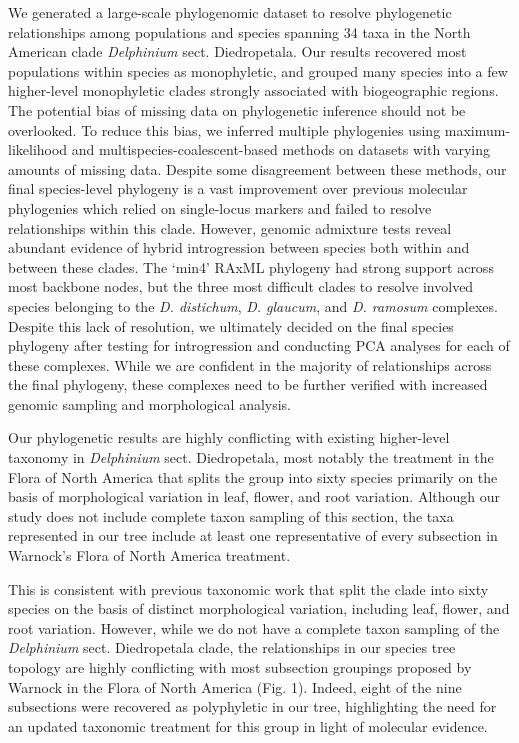 \documentclass[11pt]{article}
\begin{document}
We generated a large-scale phylogenomic dataset to resolve phylogenetic relationships 
among populations and species spanning 34 taxa in the North American clade \emph{Delphinium}
sect. Diedropetala. Our results recovered most populations within species as monophyletic,
and grouped many species into a few higher-level monophyletic clades strongly associated 
with biogeographic regions.
The potential bias of missing data on phylogenetic inference should not be overlooked. 
To reduce this bias, we inferred multiple phylogenies using maximum-likelihood and
multispecies-coalescent-based methods on datasets with varying amounts of missing data.
Despite some disagreement between these methods, our final species-level phylogeny is
a vast improvement over previous molecular phylogenies which relied on single-locus
markers and failed to resolve relationships within this clade.
% 
However, genomic admixture tests reveal abundant evidence of hybrid introgression 
between species both within and between these clades. 
% 
The ‘min4’ RAxML phylogeny had strong support across most backbone nodes, but the 
three most difficult clades to resolve involved species belonging to the 
\emph{D. distichum}, \emph{D. glaucum}, and \emph{D. ramosum} complexes. 
Despite this lack of resolution, we ultimately decided on the final species phylogeny
after testing for introgression and conducting PCA analyses for each of these complexes.
While we are confident in the majority of relationships across the final phylogeny,
these complexes need to be further verified with increased genomic sampling and
morphological analysis.


Our phylogenetic results are highly conflicting with existing higher-level taxonomy
in \emph{Delphinium} sect. Diedropetala, most notably the treatment in the Flora of 
North America that splits the group into sixty species primarily on the basis of 
morphological variation in leaf, flower, and root variation.
Although our study does not include complete taxon sampling of this section, the 
taxa represented in our tree include at least one representative of every subsection
in Warnock's Flora of North America treatment. 

This is consistent with previous taxonomic work that split the clade into sixty species 
on the basis of distinct morphological variation, including leaf, flower, and root variation.
However, while we do not have a complete taxon sampling of the \emph{Delphinium} sect. 
Diedropetala clade, the relationships in our species tree topology are highly conflicting 
with most subsection groupings proposed by Warnock in the Flora of North America (Fig. 1).
Indeed, eight of the nine subsections were recovered as polyphyletic in our tree, 
highlighting the need for an updated taxonomic treatment for this group in light of
molecular evidence.
\end{document}
